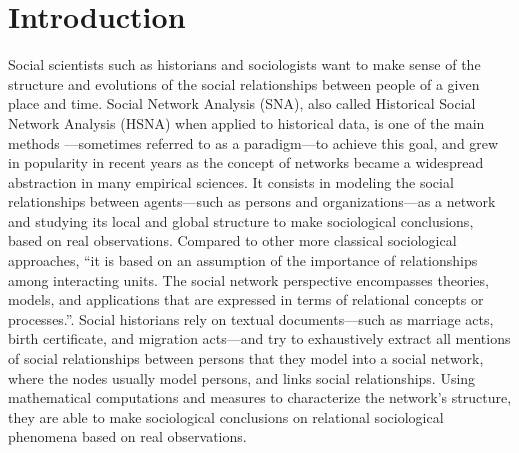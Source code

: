 


\chapter{Introduction}

Social scientists such as historians and sociologists want to make sense of the structure and evolutions of the social relationships between people of a given place and time.
Social Network Analysis (SNA), also called  Historical Social Network Analysis (HSNA) when applied to historical data, is one of the main methods ---sometimes referred to as a paradigm---to achieve this goal, and grew in popularity in recent years as the concept of networks became a widespread abstraction in many empirical sciences.
It consists in modeling the social relationships between agents---such as persons and organizations---as a network and studying its local and global structure to make sociological conclusions, based on real observations.
Compared to other more classical sociological approaches, ``it is based on an assumption of the importance of relationships among interacting units.
The social network perspective encompasses theories, models, and applications that are expressed in terms of relational concepts or processes.''\cite{wassermanSocialNetworkAnalysis1994}.
Social historians rely on textual documents---such as marriage acts, birth certificate, and migration acts---and try to exhaustively extract all mentions of social relationships between persons that they model into a social network, where the nodes usually model persons, and links social relationships.
Using mathematical computations and measures to characterize the network's structure, they are able to make sociological conclusions on relational sociological phenomena based on real observations.

